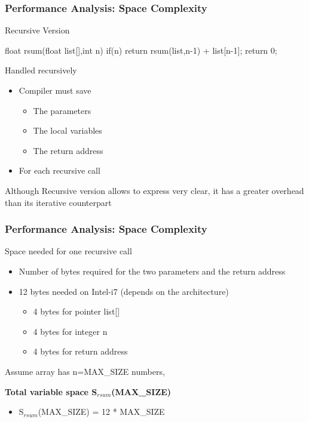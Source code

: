 \documentclass[newPxFont,sthlmFooter,nooffset]{beamer}
\begin{document}
\begin{frame}[t, fragile]
  \frametitle{Performance Analysis: Space Complexity}
Recursive Version
\begin{codedef}
float rsum(float list[],int n) {
   if(n) return rsum(list,n-1) + list[n-1]; 
   return 0;
}
\end{codedef}
Handled recursively
\begin{itemize}
\item Compiler must save
  \begin{itemize}
  \item The parameters
  \item The local variables
  \item The return address
  \end{itemize}
\item For each recursive call
\end{itemize}
Although Recursive version allows to express very clear, it has a greater overhead than its iterative counterpart
\end{frame}

\begin{frame}[t]
  \frametitle{Performance Analysis: Space Complexity}
Space needed for one recursive call
\begin{itemize}
\item Number of bytes required for the two parameters and the return
  address
\item 12 bytes needed on Intel-i7 (depends on the architecture)
  \begin{itemize}
  \item 4 bytes for pointer list[]
  \item 4 bytes for integer n
  \item 4 bytes for return address
  \end{itemize}

\end{itemize}

\textsf{Assume} array has n=MAX\_SIZE numbers, 

\textbf{Total variable space S$_{rsum}$(MAX\_SIZE)}
\begin{itemize}
\item S$_{rsum}$(MAX\_SIZE) = 12 * MAX\_SIZE
\end{itemize}
\end{frame}
\end{document}
